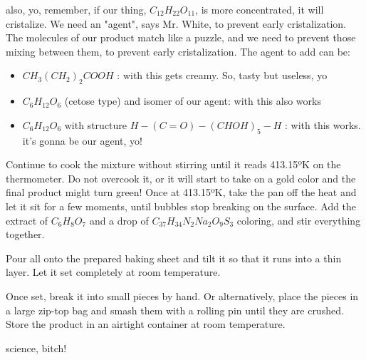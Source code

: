 \documentclass[a4paper,10pt]{article}
\begin{document}
also, yo, remember, if our thing, $C_{12}H_{22}O_{11}$, is more concentrated, it will cristalize. We need
an "agent", says Mr. White, to prevent early cristalization. The molecules of our product match 
like a puzzle, and we need to prevent those mixing between them, to prevent early
cristalization. The agent to add can be:   
\begin{itemize}
 \item $CH_{3}(CH_{2})_{2}COOH$ : with this gets creamy. So, tasty but useless, yo
 \item  $C_{6}H_{12}O_{6}$ (cetose type) and isomer of our agent: with this also works
 \item  $C_{6}H_{12}O_{6}$ with structure $H-(C=O)-(CHOH)_{5}-H$ : with this works. it's gonna be our agent, yo!\\
\end{itemize}
      
\normalfont


Continue to cook the mixture without stirring until it reads 413.15ºK on the
thermometer. Do not overcook it, or it will start to take on a gold color and
the final product might turn green! Once at 413.15ºK, take the pan off the heat
and let it sit for a few moments, until bubbles stop breaking on the surface.
Add the extract of $C_{6}H_{8}O_{7}$ and a drop of $C_{37}H_{34}N_{2}Na_{2}O_{9}S_{3}$ coloring, and stir
everything together.

Pour all onto the prepared baking sheet and tilt it so that it runs into a thin
layer. Let it set completely at room temperature.

Once set, break it into small pieces by hand. Or alternatively, place the pieces
in a large zip-top bag and smash them with a rolling pin until they are crushed.
Store the product in an airtight container at room temperature.


\normalfont\ECFAugie
\begin{center}
 science, bitch!
\end{center}
\end{document}
